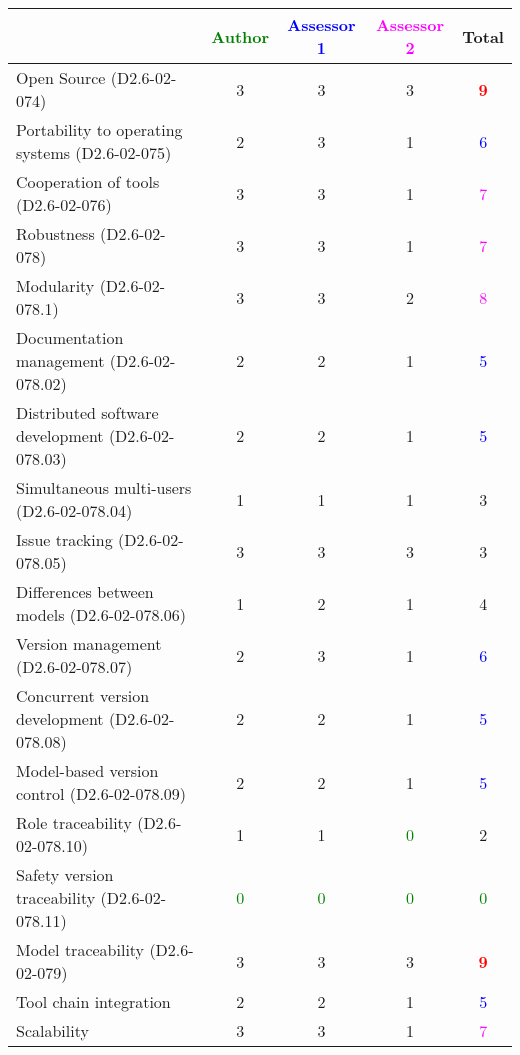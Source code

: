 \begin{tabular}{|l | c | c | c | c|}
\hline
& \textcolor{green}{Author} & \textcolor{blue}{Assessor 1} & \textcolor{magenta}{Assessor 2} & Total \\
\hline 
Open Source (D2.6-02-074) & 3     & 3     & 3     & \textcolor{red}{\textbf{9}}  \\
\hline 
Portability to operating systems (D2.6-02-075) & 2     & 3     & 1     & \textcolor{blue}{6}  \\
\hline
Cooperation of tools (D2.6-02-076) & 3     & 3     & 1     & \textcolor{magenta}{7} \\
\hline
Robustness (D2.6-02-078) & 3     & 3     & 1     & \textcolor{magenta}{7} \\
\hline
Modularity (D2.6-02-078.1) & 3     & 3     & 2     & \textcolor{magenta}{8} \\
\hline
Documentation management (D2.6-02-078.02) & 2     & 2     & 1     & \textcolor{blue}{5} \\
\hline
Distributed software development (D2.6-02-078.03)  & 2     & 2     & 1     & \textcolor{blue}{5} \\
\hline
Simultaneous multi-users (D2.6-02-078.04)   & 1     & 1     & 1     & 3     \\
\hline
Issue tracking (D2.6-02-078.05) & 3     & 3     & 3     & 3     \\
\hline
Differences between models (D2.6-02-078.06) & 1     & 2     & 1     & 4     \\
\hline
Version management (D2.6-02-078.07) & 2     & 3     & 1     & \textcolor{blue}{6} \\
\hline
Concurrent version development (D2.6-02-078.08) & 2     & 2     & 1     & \textcolor{blue}{5} \\
\hline
Model-based version control (D2.6-02-078.09) & 2     & 2     & 1     & \textcolor{blue}{5} \\
\hline
Role traceability (D2.6-02-078.10) & 1     & 1     & \textcolor{green}{0} & 2     \\
\hline
Safety version traceability (D2.6-02-078.11) & \textcolor{green}{0} & \textcolor{green}{0} & \textcolor{green}{0} & \textcolor{green}{0} \\
\hline
Model traceability (D2.6-02-079) & 3     & 3     & 3     & \textcolor{red}{\textbf{9}} \\
\hline
Tool chain integration & 2     & 2     & 1     & \textcolor{blue}{5} \\
\hline
Scalability & 3     & 3     & 1     & \textcolor{magenta}{7} \\
\hline
\end{tabular}

